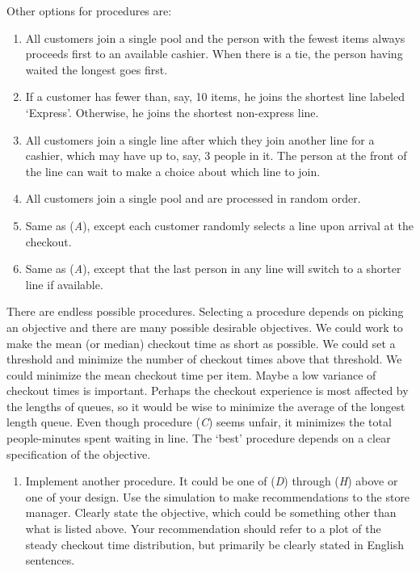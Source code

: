 \documentclass[letter]{article}
\begin{document}
Other options for procedures are:
\begin{enumerate}[label=(\textit{\Alph*}), start=3]
\item All customers join a single pool and the person with the fewest items always proceeds first to an available cashier. When there is a tie, the person having waited the longest goes first.
\item If a customer has fewer than, say, 10 items, he joins the shortest line labeled `Express'. Otherwise, he joins the shortest non-express line.
\item All customers join a single line after which they join another line for a cashier, which may have up to, say, 3 people in it. The person at the front of the line can wait to make a choice about which line to join.
\item All customers join a single pool and are processed in random order.
\item Same as (\textit{A}), except each customer randomly selects a line upon arrival at the checkout.
\item Same as (\textit{A}), except that the last person in any line will switch to a shorter line if available.
\end{enumerate}

There are endless possible procedures. Selecting a procedure depends on picking an objective and there are many possible desirable objectives. We could work to make the mean (or median) checkout time as short as possible. We could set a threshold and minimize the number of checkout times above that threshold. We could minimize the mean checkout time per item. Maybe a low variance of checkout times is important. Perhaps the checkout experience is most affected by the lengths of queues, so it would be wise to minimize the average of the longest length queue. Even though procedure (\textit{C}) seems unfair, it minimizes the total people-minutes spent waiting in line. The `best' procedure depends on a clear specification of the objective.



\begin{enumerate}[label=\textbf{Task \arabic*.}, start=2]
\item Implement another procedure. It could be one of (\textit{D}) through (\textit{H}) above or one of your design. Use the simulation to make recommendations to the store manager. Clearly state the objective, which could be something other than what is listed above. Your recommendation should refer to a plot of the steady checkout time distribution, but primarily be clearly stated in English sentences.
\end{enumerate}
\end{document}
